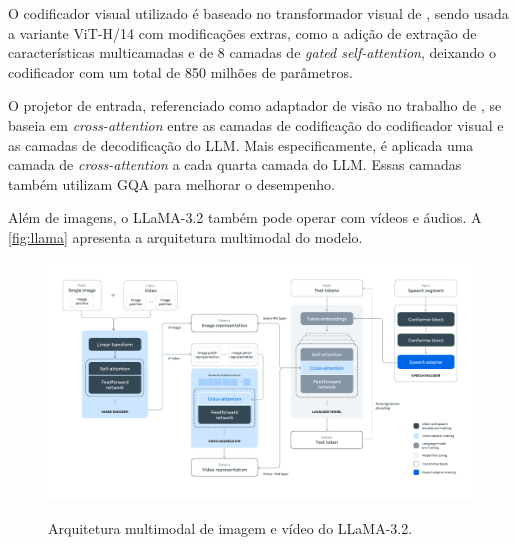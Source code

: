 O codificador visual utilizado é baseado no transformador visual de \textcite{dosovitskiy2020image}, sendo usada a
variante \ac{ViT}-H/14 com modificações extras, como a adição de extração de características multicamadas e de 8
camadas de \textit{gated self-attention}, deixando o codificador com um total de 850 milhões de parâmetros.

O projetor de entrada, referenciado como adaptador de visão no trabalho de \textcite{dubey2024llama}, se baseia em
\textit{cross-attention} entre as camadas de codificação do codificador visual e as camadas de decodificação do
\ac{LLM}. Mais especificamente, é aplicada uma camada de \textit{cross-attention} a cada quarta camada do \ac{LLM}.
Essas camadas também utilizam \ac{GQA} para melhorar o desempenho.

Além de imagens, o \ac{LLaMA}-3.2 também pode operar com vídeos e áudios. A \autoref{fig:llama} apresenta a arquitetura
multimodal do modelo.

\begin{figure}[ht]
    \centering
    \caption{\small Arquitetura multimodal de imagem e vídeo do \ac{LLaMA}-3.2.}
    \includegraphics[width=1.0\columnwidth,keepaspectratio]{images/llama.pdf}
    \label{fig:llama}
\end{figure}
